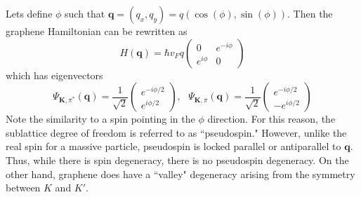 \documentclass[a4paper,12pt]{article}
\renewcommand{\vec}[1]{\boldsymbol{\mathbf{#1}}}
\begin{document}
Lets define $\phi$ such that $\vec{q}=(q_x,q_y)=q(\cos(\phi),\sin(\phi))$.  Then the graphene Hamiltonian can be rewritten as
\begin{equation}
H(\vec{q})= \hbar v_F q \left(
\begin{array}{cc}
0 & e^{-i \phi}  \\
e^{i \phi} & 0
\end{array}
\right)
\end{equation}
which has eigenvectors
\begin{equation}
\Psi_{\vec{K}, \pi^*} (\vec{q} )=\frac{1}{\sqrt{2}} \begin{pmatrix}
e^{-i \phi/2} \\ e^{i \phi/2}
\end{pmatrix}, \text{ }
\Psi_{\vec{K}, \pi} (\vec{q} )=\frac{1}{\sqrt{2}} \begin{pmatrix}
e^{-i \phi/2} \\ -
e^{i \phi/2}
\end{pmatrix}
\end{equation}
Note the similarity to a spin pointing in the $\phi$ direction.  For this reason, the sublattice degree of freedom is referred to as ``pseudospin."  However, unlike the real spin for a massive particle, pseudospin is locked parallel or antiparallel to $\vec{q}$.  Thus, while there is spin degeneracy, there is no pseudospin degeneracy.  On the other hand, graphene does have a ``valley" degeneracy arising from the symmetry between $K$ and $K'$.
\end{document}
